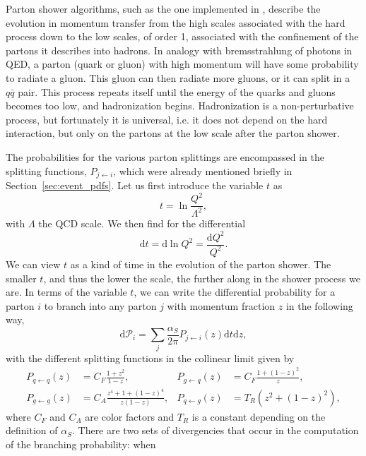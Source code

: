 Parton shower algorithms, such as the one implemented in \PYTHIA, describe the evolution in
momentum transfer from the high scales associated with the hard process down to the low scales, of
order 1\GeV, associated with the confinement of the partons it describes into hadrons. 
In analogy with bremsstrahlung of photons in QED, a parton (quark or gluon) with high momentum will
have some probability to radiate a gluon. This gluon can then radiate more gluons, or it can split
in a $q\bar{q}$ pair. This process repeats itself until the energy of the quarks and gluons becomes
too low, and hadronization begins. Hadronization is a non-perturbative process, but fortunately it
is universal, i.e. it does not depend on the hard interaction, but only on the partons at the low
scale after the parton shower.

The probabilities for the various parton splittings are encompassed in the splitting functions,
$P_{j\leftarrow i}$, which were already mentioned briefly in Section~\ref{sec:event_pdfs}.
Let us first introduce the variable $t$ as
\begin{equation}
  t = \ln\frac{Q^2}{\Lambda^2},
\end{equation}
with $\Lambda$ the QCD scale. We then find for the differential
\begin{equation}
  \text{d}t = \text{d}\ln Q^2 = \frac{\text{d}Q^2}{Q^2}.
\end{equation}
We can view $t$ as a kind of time in the evolution of the parton shower. The smaller $t$, and
thus the lower the scale, the further along in the shower process we are. 
In terms of the variable $t$, we can write the differential probability for a parton $i$ to branch
into any parton $j$ with momentum fraction $z$ in the following way,
\begin{equation}
  \text{d}\mathcal{P}_i = \sum_j \frac{\alpha_S}{2\pi} P_{j\leftarrow i}(z)\text{d}t\text{d}z,
\label{eq:splitting}
\end{equation}
with the different splitting functions in the collinear limit given by
\begin{align}
  P_{q\leftarrow q}(z) &= C_F \frac{1 + z^2}{1 - z}, & 
  P_{g\leftarrow q}(z) &= C_F \frac{1 + (1-z)^2}{z}, \\
  P_{g\leftarrow g}(z) &= C_A \frac{z^4 + 1 + (1-z)^4}{z(1-z)}, &
  P_{q\leftarrow g}(z) &= T_R (z^2 + (1-z)^2), 
\end{align}
where $C_F$ and $C_A$ are color factors and $T_R$ is a constant depending on the definition of
$\alpha_S$. 
There are two sets of divergencies that occur in the computation of the branching probability: when
